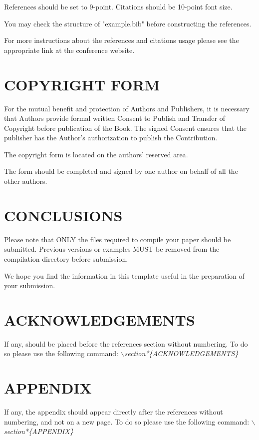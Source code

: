 \documentclass[a4paper,twoside]{article}
\begin{document}
References should be set to 9-point. Citations should be 10-point
font size.

You may check the structure of "example.bib" before constructing the
references.

For more instructions about the references and citations usage
please see the appropriate link at the conference website.

\section{\uppercase{Copyright Form}}

For the mutual benefit and protection of Authors and
Publishers, it is necessary that Authors provide formal written
Consent to Publish and Transfer of Copyright before publication of
the Book. The signed Consent ensures that the publisher has the
Author's authorization to publish the Contribution.

The copyright form is located on the authors' reserved area.

The form should be completed and signed by one author on
behalf of all the other authors.

\section{\uppercase{Conclusions}}
\label{sec:conclusion}

Please note that ONLY the files required to compile your paper should be submitted. Previous versions or examples MUST be removed from the compilation directory before submission.

We hope you find the information in this template useful in the preparation of your submission.


\section*{\uppercase{Acknowledgements}}

If any, should be placed before the references section
without numbering. To do so please use the following command:
\textit{$\backslash$section*\{ACKNOWLEDGEMENTS\}}



{\small
}


\section*{\uppercase{Appendix}}

If any, the appendix should appear directly after the
references without numbering, and not on a new page. To do so please use the following command:
\textit{$\backslash$section*\{APPENDIX\}}
\end{document}
